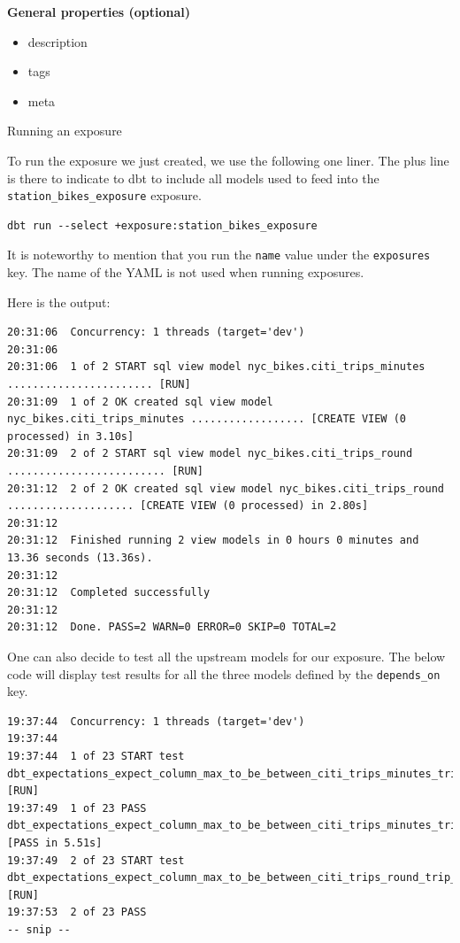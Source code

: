 \documentclass[
]{book}
\providecommand{\tightlist}{%
  \setlength{\itemsep}{0pt}\setlength{\parskip}{0pt}}
\begin{document}
\textbf{General properties (optional)}

\begin{itemize}
\tightlist
\item
  description
\item
  tags
\item
  meta
\end{itemize}

Running an exposure

To run the exposure we just created, we use the following one liner. The plus line is there to indicate to dbt to include all models used to feed into the \texttt{station\_bikes\_exposure} exposure.

\begin{verbatim}
dbt run --select +exposure:station_bikes_exposure
\end{verbatim}

It is noteworthy to mention that you run the \texttt{name} value under the \texttt{exposures} key. The name of the YAML is not used when running exposures.

Here is the output:

\begin{verbatim}
20:31:06  Concurrency: 1 threads (target='dev')
20:31:06  
20:31:06  1 of 2 START sql view model nyc_bikes.citi_trips_minutes ....................... [RUN]
20:31:09  1 of 2 OK created sql view model nyc_bikes.citi_trips_minutes .................. [CREATE VIEW (0 processed) in 3.10s]
20:31:09  2 of 2 START sql view model nyc_bikes.citi_trips_round ......................... [RUN]
20:31:12  2 of 2 OK created sql view model nyc_bikes.citi_trips_round .................... [CREATE VIEW (0 processed) in 2.80s]
20:31:12  
20:31:12  Finished running 2 view models in 0 hours 0 minutes and 13.36 seconds (13.36s).
20:31:12  
20:31:12  Completed successfully
20:31:12  
20:31:12  Done. PASS=2 WARN=0 ERROR=0 SKIP=0 TOTAL=2
\end{verbatim}

One can also decide to test all the upstream models for our exposure. The below code will display test results for all the three models defined by the \texttt{depends\_on} key.

\begin{verbatim}
19:37:44  Concurrency: 1 threads (target='dev')
19:37:44  
19:37:44  1 of 23 START test dbt_expectations_expect_column_max_to_be_between_citi_trips_minutes_trip_duration_min__326000__16  [RUN]
19:37:49  1 of 23 PASS dbt_expectations_expect_column_max_to_be_between_citi_trips_minutes_trip_duration_min__326000__16  [PASS in 5.51s]
19:37:49  2 of 23 START test dbt_expectations_expect_column_max_to_be_between_citi_trips_round_trip_duration_min__326000__16  [RUN]
19:37:53  2 of 23 PASS 
-- snip --
\end{verbatim}
\end{document}
